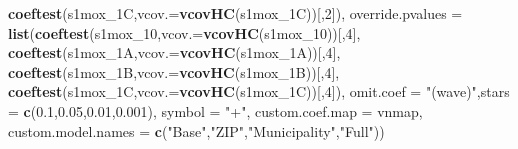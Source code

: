 \documentclass[
]{article}
\newenvironment{Shaded}{\begin{snugshade}}{\end{snugshade}}
\newcommand{\DataTypeTok}[1]{\textcolor[rgb]{0.13,0.29,0.53}{#1}}
\newcommand{\DecValTok}[1]{\textcolor[rgb]{0.00,0.00,0.81}{#1}}
\newcommand{\FloatTok}[1]{\textcolor[rgb]{0.00,0.00,0.81}{#1}}
\newcommand{\KeywordTok}[1]{\textcolor[rgb]{0.13,0.29,0.53}{\textbf{#1}}}
\newcommand{\NormalTok}[1]{#1}
\newcommand{\StringTok}[1]{\textcolor[rgb]{0.31,0.60,0.02}{#1}}
\begin{document}
\begin{Shaded}
\begin{Highlighting}[]
                             \KeywordTok{coeftest}\NormalTok{(s1mox_1C,}\DataTypeTok{vcov.=}\KeywordTok{vcovHC}\NormalTok{(s1mox_1C))[,}\DecValTok{2}\NormalTok{]),}
          \DataTypeTok{override.pvalues =} \KeywordTok{list}\NormalTok{(}\KeywordTok{coeftest}\NormalTok{(s1mox_}\DecValTok{10}\NormalTok{,}\DataTypeTok{vcov.=}\KeywordTok{vcovHC}\NormalTok{(s1mox_}\DecValTok{10}\NormalTok{))[,}\DecValTok{4}\NormalTok{],}
                                  \KeywordTok{coeftest}\NormalTok{(s1mox_1A,}\DataTypeTok{vcov.=}\KeywordTok{vcovHC}\NormalTok{(s1mox_1A))[,}\DecValTok{4}\NormalTok{],}
                                  \KeywordTok{coeftest}\NormalTok{(s1mox_1B,}\DataTypeTok{vcov.=}\KeywordTok{vcovHC}\NormalTok{(s1mox_1B))[,}\DecValTok{4}\NormalTok{],}
                                  \KeywordTok{coeftest}\NormalTok{(s1mox_1C,}\DataTypeTok{vcov.=}\KeywordTok{vcovHC}\NormalTok{(s1mox_1C))[,}\DecValTok{4}\NormalTok{]),}
          \DataTypeTok{omit.coef =} \StringTok{"(wave)"}\NormalTok{,}\DataTypeTok{stars =} \KeywordTok{c}\NormalTok{(}\FloatTok{0.1}\NormalTok{,}\FloatTok{0.05}\NormalTok{,}\FloatTok{0.01}\NormalTok{,}\FloatTok{0.001}\NormalTok{), }\DataTypeTok{symbol =} \StringTok{"+"}\NormalTok{,}
          \DataTypeTok{custom.coef.map =}\NormalTok{ vnmap, }
          \DataTypeTok{custom.model.names =} \KeywordTok{c}\NormalTok{(}\StringTok{"Base"}\NormalTok{,}\StringTok{"ZIP"}\NormalTok{,}\StringTok{"Municipality"}\NormalTok{,}\StringTok{"Full"}\NormalTok{))}
\end{Highlighting}
\end{Shaded}
\end{document}
